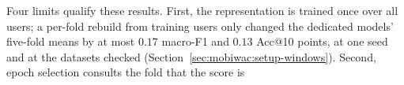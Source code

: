 Four limits qualify these results. First, the representation is trained once over all users; a
per-fold rebuild from training users only changed the dedicated models' five-fold means by at most
$0.17$ macro-F1 and $0.13$ Acc@10 points, at one seed and at the datasets checked
(Section~\ref{sec:mobiwac:setup-windows}).
Second, epoch selection consults the fold that the score is
